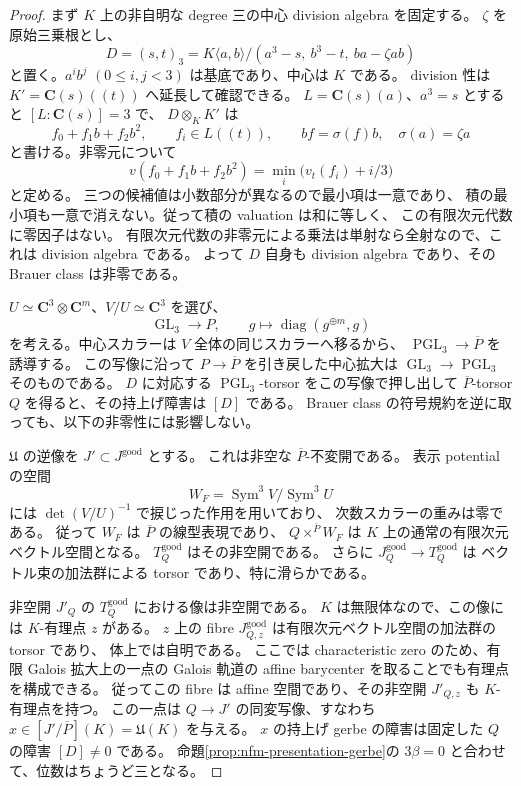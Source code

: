 \begin{proof}
まず $K$ 上の非自明な degree 三の中心 division algebra を固定する。
$\zeta$ を原始三乗根とし、
\[
 D=(s,t)_3
 =K\langle a,b\rangle/
 (a^3-s,\ b^3-t,\ ba-\zeta ab)
\]
と置く。$a^i b^j$ $(0\le i,j<3)$ は基底であり、中心は $K$ である。
division 性は $K'=\mathbf C(s)((t))$ へ延長して確認できる。
$L=\mathbf C(s)(a)$、$a^3=s$ とすると $[L:\mathbf C(s)]=3$ で、
$D\otimes_KK'$ は
\[
 f_0+f_1b+f_2b^2,\qquad f_i\in L((t)),\qquad
 bf=\sigma(f)b,\quad\sigma(a)=\zeta a
\]
と書ける。非零元について
\[
 v(f_0+f_1b+f_2b^2)
 =\min_i\bigl(v_t(f_i)+i/3\bigr)
\]
と定める。
三つの候補値は小数部分が異なるので最小項は一意であり、
積の最小項も一意で消えない。従って積の valuation は和に等しく、
この有限次元代数に零因子はない。
有限次元代数の非零元による乗法は単射なら全射なので、これは division algebra である。
よって $D$ 自身も division algebra であり、その Brauer class は非零である。

$U\simeq\mathbf C^3\otimes\mathbf C^m$、$V/U\simeq\mathbf C^3$ を選び、
\[
 \operatorname{GL}_3\longrightarrow P,\qquad
 g\longmapsto\operatorname{diag}(g^{\oplus m},g)
\]
を考える。中心スカラーは $V$ 全体の同じスカラーへ移るから、
$\operatorname{PGL}_3\to\overline P$ を誘導する。
この写像に沿って $P\to\overline P$ を引き戻した中心拡大は
$\operatorname{GL}_3\to\operatorname{PGL}_3$ そのものである。
$D$ に対応する $\operatorname{PGL}_3$-torsor
\cite[Tag~03R6]{NFMStacksBrauerForms}をこの写像で押し出して
$\overline P$-torsor $Q$ を得ると、その持上げ障害は $[D]$ である。
Brauer class の符号規約を逆に取っても、以下の非零性には影響しない。

$\mathfrak U$ の逆像を $J'\subset J^{\mathrm{good}}$ とする。
これは非空な $\overline P$-不変開である。
表示 potential の空間
\[
 W_F=\operatorname{Sym}^3V/\operatorname{Sym}^3U
\]
には $\det(V/U)^{-1}$ で捩じった作用を用いており、
次数スカラーの重みは零である。
従って $W_F$ は $\overline P$ の線型表現であり、
$Q\times^{\overline P}W_F$ は $K$ 上の通常の有限次元ベクトル空間となる。
$T^{\mathrm{good}}_Q$ はその非空開である。
さらに $J^{\mathrm{good}}_Q\to T^{\mathrm{good}}_Q$ は
ベクトル束の加法群による torsor であり、特に滑らかである。

非空開 $J'_Q$ の $T^{\mathrm{good}}_Q$ における像は非空開である。
$K$ は無限体なので、この像には $K$-有理点 $z$ がある。
$z$ 上の fibre $J^{\mathrm{good}}_{Q,z}$ は有限次元ベクトル空間の加法群の torsor であり、
体上では自明である。
ここでは characteristic zero のため、有限 Galois 拡大上の一点の
Galois 軌道の affine barycenter を取ることでも有理点を構成できる。
従ってこの fibre は affine 空間であり、その非空開 $J'_{Q,z}$ も $K$-有理点を持つ。
この一点は $Q\to J'$ の同変写像、すなわち
$x\in[J'/\overline P](K)=\mathfrak U(K)$ を与える。
$x$ の持上げ gerbe の障害は固定した $Q$ の障害 $[D]\ne0$ である。
命題\ref{prop:nfm-presentation-gerbe}の $3\beta=0$ と合わせて、位数はちょうど三となる。
\end{proof}

